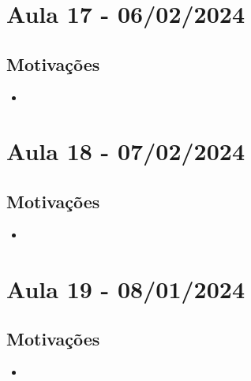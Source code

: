 \documentclass{article}
\begin{document}
\section{Aula 17 - 06/02/2024}
\subsection{Motivações}
\begin{itemize}
	\item
\end{itemize}
\newpage
\section{Aula 18 - 07/02/2024}
\subsection{Motivações}
\begin{itemize}
	\item
\end{itemize}
\newpage

\section{Aula 19 - 08/01/2024}
\subsection{Motivações}
\begin{itemize}
	\item
\end{itemize}
\newpage
\end{document}
